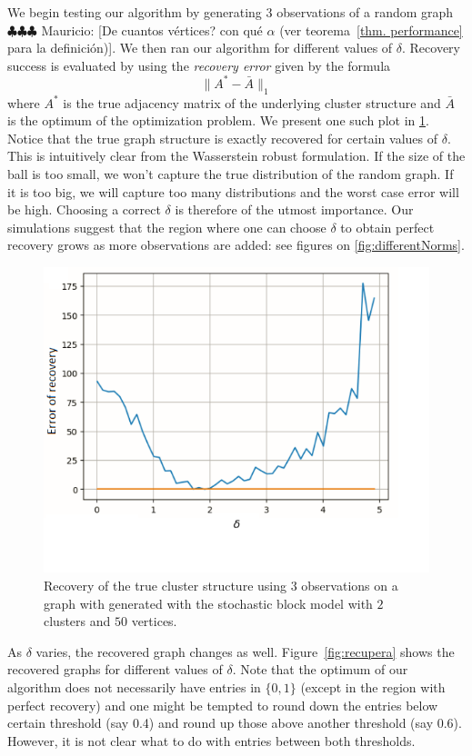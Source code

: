 \documentclass[12pt]{amsart}
\theoremstyle{remark}
\newcommand{\mv}[1]{{\color{red} \sf $\clubsuit\clubsuit\clubsuit$ Mauricio: [#1]}}
\begin{document}
We begin testing our algorithm by generating $3$ observations of a random graph \mv{De cuantos v\'ertices? con qu\'e $\alpha$ (ver teorema~\ref{thm. performance} para la definici\'on)}. We then ran our algorithm for different values of $\delta$. Recovery success is evaluated by using the \textit{recovery error} given by the formula
\[\|A^*-\bar{A}\|_1\]
where $A^*$ is the true adjacency matrix of the underlying cluster structure and $\bar{A}$ is the optimum of the optimization problem.
We present one such plot in \ref{fig:errorRecovery}. Notice that the true graph structure is exactly recovered for certain values of $\delta$.
This is intuitively clear from the Wasserstein robust formulation. If the size of the ball is too small, we won't capture the true distribution of the random graph. If it is too big, we will capture too many distributions and the worst case error will be high.
Choosing a correct $\delta$ is therefore of the utmost importance. Our simulations suggest that the region where one can choose $\delta$ to obtain perfect recovery grows as more observations are added: see figures on \ref{fig:differentNorms}.
\begin{figure}[h]
\centering
\includegraphics[width=1\textwidth]{./Pictures/ErrorRecovery.PNG}
\caption{Recovery of the true cluster structure using $3$ observations on a graph with generated with the stochastic block model with $2$ clusters and $50$ vertices.}
 \label{fig:errorRecovery}
\end{figure}

As $\delta$ varies, the recovered graph changes as well. Figure~\ref{fig:recupera} shows the recovered graphs for different values of $\delta$. Note that the optimum of our algorithm does not necessarily have entries in $\{0,1\}$ (except in the region with perfect recovery) and one might be tempted to round down the entries below certain threshold (say 0.4) and round up those above another threshold (say 0.6). However, it is not clear what to do with entries between both thresholds. 
\end{document}
